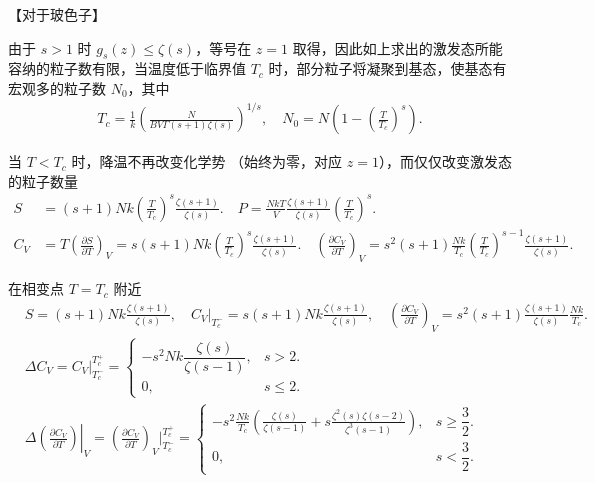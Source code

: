 【对于玻色子】

由于 \(s > 1\) 时 \(g_{s}(z) \le \zeta(s)\)，等号在 \(z = 1\) 取得，因此如上求出的激发态所能容纳的粒子数有限，当温度低于临界值 \(T_{c}\) 时，部分粒子将凝聚到基态，使基态有宏观多的粒子数 \(N_{0}\)，其中
\begin{align*}
	T_{c} = \frac{1}{k} \left( \frac{N}{B V \Gamma(s+1) \zeta(s)} \right)^{1/s}, \quad N_{0} = N \left( 1 - \left( \frac{T}{T_{c}} \right)^{s} \right).
\end{align*}

当 \(T < T_{c}\) 时，降温不再改变化学势 （始终为零，对应 \(z = 1\)），而仅仅改变激发态的粒子数量
\begin{align*}
	S &= (s+1) N k \left( \frac{T}{T_{c}} \right)^{s} \frac{\zeta(s+1)}{\zeta(s)}. \quad
	P = \frac{N k T}{V} \frac{\zeta(s+1)}{\zeta(s)} \left( \frac{T}{T_{c}} \right)^{s}. \\
	C_{V} &= T \left( \frac{\partial S}{\partial T} \right)_{V} = s (s+1) N k \left( \frac{T}{T_{c}} \right)^{s} \frac{\zeta(s+1)}{\zeta(s)}. \quad
	\left( \frac{\partial C_{V}}{\partial T} \right)_{V} = s^{2} (s+1) \frac{N k}{T_{c}} \left( \frac{T}{T_{c}} \right)^{s-1} \frac{\zeta(s+1)}{\zeta(s)}.
\end{align*}

在相变点 \(T = T_{c}\) 附近
\begin{align*}
	&S = (s+1) N k \frac{\zeta(s+1)}{\zeta(s)},\quad C_{V}\big|_{T_{c}^{-}} = s (s+1) N k \frac{\zeta(s+1)}{\zeta(s)},\quad \left( \frac{\partial C_{V}}{\partial T} \right)_{V} = s^{2} (s+1) \frac{\zeta(s+1)}{\zeta(s)} \frac{N k}{T_{c}}.\\
	&\Delta C_{V} = C_{V} \big|_{T_{c}^{-}}^{T_{c}^{+}} =
	\begin{cases}
		-s^{2} N k \dfrac{\zeta(s)}{\zeta(s-1)}, & s > 2.   \\
		0,                                       & s \le 2.
	\end{cases}\\
	&\Delta \left.\left( \frac{\partial C_{V}}{\partial T} \right)\right|_{V} = \left( \frac{\partial C_{V}}{\partial T} \right)_{V} \big|_{T_{c}^{-}}^{T_{c}^{+}} =
	\begin{cases}
		\displaystyle -s^{2} \frac{N k}{T_{c}} \left( \frac{\zeta(s)}{\zeta(s-1)} + s \frac{\zeta^{2}(s) \zeta(s-2)}{\zeta^{3}(s-1)} \right), & s \ge \dfrac{3}{2}. \\
		0,                                                                                                                                    & s < \dfrac{3}{2}.
	\end{cases}
\end{align*}

